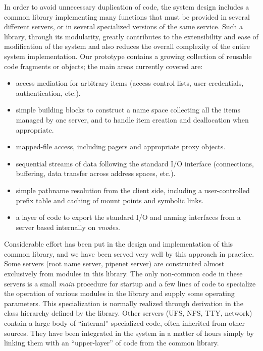 In order to avoid unnecessary duplication of code, the system design
includes a common library implementing many functions that must be
provided in several different servers, or in several specialized
versions of the same service. Such a library, through its modularity,
greatly contributes to the extensibility and ease of modification of
the system and also reduces the overall complexity of the entire
system implementation.  Our prototype contains a growing collection of
reusable code fragments or objects; the main areas currently covered
are:
\begin{itemize}

\item access mediation for arbitrary items (access control lists, user
credentials, authentication, etc.).

\item simple building blocks to construct a name space collecting all
the items managed by one server, and to handle item creation and
deallocation when appropriate.

\item mapped-file access, including pagers and appropriate proxy
objects.

\item sequential streams of data following the standard I/O interface
(connections, buffering, data transfer across address spaces, etc.).

\item simple pathname resolution from the client side, including a
user-controlled prefix table and caching of mount points and symbolic
links.

\item a layer of code to export the standard I/O and naming interfaces
from a server based internally on {\em vnodes}\cite{KLEIMAN86}.

\end{itemize}
Considerable effort has been put in the design and implementation of
this common library, and we have been served very well by this
approach in practice.  Some servers (root name server, pipenet server)
are constructed almost exclusively from modules in this library.  The
only non-common code in these servers is a small {\em main} procedure
for startup and a few lines of code to specialize the operation of
various modules in the library and supply some operating parameters.
This specialization is normally realized through derivation in the
class hierarchy defined by the library.  Other servers (UFS, NFS, TTY,
network) contain a large body of ``internal'' specialized code, often
inherited from other sources. They have been integrated in the system
in a matter of hours simply by linking them with an ``upper-layer'' of
code from the common library.

